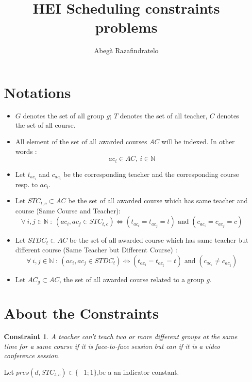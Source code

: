 \documentclass[12pt,a4paper]{article}
\author{Abegà Razafindratelo}
\title{HEI Scheduling constraints problems}
\newtheorem{theorem}{Constraint}
\begin{document}
\maketitle
\section*{Notations}
\begin{itemize}
	
	\item $G$ denotes the set of all group $g$; $T$ denotes the set of all teacher, $C$ denotes the set of all course.
	
	\item All element of the set of all awarded courses $AC$ will be indexed. In other words :
	$$
	 ac_{i} \in AC,\ i \in \mathbb{N}
	$$
	
	\item Let $t_{ac_{i}}$ and $c_{ac_{i}}$ be the corresponding teacher and the corresponding course resp. to  $ac_{i}$.
	
	\item Let $STC_{t,c} \subset AC$  be the set of all awarded course which has same teacher and course (Same Course and Teacher):
	$$
	\forall \ i, j \in \mathbb{N} \ : \ \left(ac_{i}, ac_{j} \in  STC_{t,c}\right)                            \Longleftrightarrow \left(t_{ac_{i}} = t_{ac_{j}}  = t \right) \text{ and } 
	\left(c_{ac_{i}} = c_{ac_{j}}  =  c \right)
	$$ 
	
	\item Let $STDC_{t} \subset AC$ be the set of all awarded course which has same teacher but different course (Same Teacher but Different Course) :
	$$
	\forall \ i, j \in \mathbb{N} \ : \ \left(ac_{i}, ac_{j} \in  STDC_{t}\right)                            \Longleftrightarrow \left(t_{ac_{i}} = t_{ac_{j}}  = t \right) \text{ and } 
	\left(c_{ac_{i}} \neq c_{ac_{j}} \right)
	$$ 
	
	\item Let $AC_{g} \subset AC$, the set of all awarded course related to a group $g$.

\end{itemize}
\newpage
\section*{About the Constraints}

\begin{theorem}
A teacher can't teach two or more different groups at the same time for a same course if it is face-to-face session but can if it is a video conference session.
\end{theorem}
Let $pres(d, STC_{t,c}) \in \lbrace -1;1 \rbrace  $,be a an indicator constant.
	
\end{document}
